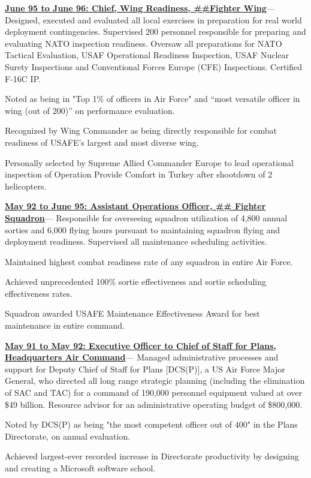 \documentclass[10pt,letterpaper]{article}
\newenvironment{accomplishments}{%
	\begin{list}{\textbullet}{%
        \setlength\leftmargin{1em}      %
        \setlength\topsep{0ex}          %
        \setlength\parskip{0.5ex}
        \setstretch{0.8}
        \setlength\listparindent{1em}   %
        \setlength\parsep{0in}          %
        \setlength\itemsep{0.5ex}         %
        }
}{
	\end{list}
}
\newcommand{\accomplishment}{\item }
\newenvironment{job}[4]{%
\vspace{0.0em}
\noindent\textbf{\underline{{#1: #2\ifthenelse{\isempty{#3}}{}{, #3}}}}---#4%
\noindent\begin{accomplishments}{}
}{
\end{accomplishments}
\vspace{1.5em}
}
\begin{document}
\begin{job}{June 95 to June 96}{Chief, Wing Readiness, \#\#Fighter Wing}{}{%
Designed, executed and evaluated all local exercises in preparation
for real world deployment contingencies. Supervised 200 personnel responsible for preparing and evaluating NATO inspection
readiness. Oversaw all preparations for NATO Tactical Evaluation, USAF Operational Readiness Inspection, USAF Nuclear Surety
Inspections and Conventional Forces Europe (CFE) Inspections. Certified F-16C IP.
}
\accomplishment Noted as being in "Top 1\% of officers in Air Force" and “most versatile officer in wing (out of 200)” on performance evaluation.
\accomplishment Recognized by Wing Commander as being directly responsible for combat readiness of USAFE’s largest and most diverse wing.
\accomplishment Personally selected by Supreme Allied Commander Europe to lead operational inspection of Operation Provide Comfort in Turkey
after shootdown of 2 helicopters.
\end{job}

\begin{job}{May 92 to June 95}{Assistant Operations Officer, \#\# Fighter Squadron}{USAFB}{%
Responsible for overseeing squadron
utilization of 4,800 annual sorties and 6,000 flying hours pursuant to maintaining squadron flying and deployment readiness.
Supervised all maintenance scheduling activities.
}
\accomplishment Maintained highest combat readiness rate of any squadron in entire Air Force.
\accomplishment Achieved unprecedented 100\% sortie effectiveness and sortie scheduling effectiveness rates.
\accomplishment Squadron awarded USAFE Maintenance Effectiveness Award for best maintenance in entire command.
\end{job}

\begin{job}{May 91 to May 92}{Executive Officer to Chief of Staff for Plans, Headquarters Air Command}{}{%
Managed administrative
processes and support for Deputy Chief of Staff for Plans [DCS(P)], a US Air Force Major General, who directed all long range
strategic planning (including the elimination of SAC and TAC) for a command of 190,000 personnel equipment valued at over \$49
billion. Resource advisor for an administrative operating budget of \$800,000.
}
\accomplishment Noted by DCS(P) as being "the most competent officer out of 400" in the Plans Directorate, on annual evaluation.
\accomplishment Achieved largest-ever recorded increase in Directorate productivity by designing and creating a Microsoft software school.
\end{job}
\end{document}
